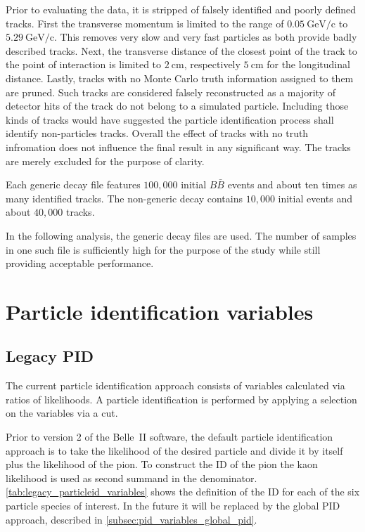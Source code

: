 Prior to evaluating the data, it is stripped of falsely identified and poorly defined tracks. First the transverse momentum is limited to the range of $0.05 \mathrm{~GeV/c}$ to $5.29 \mathrm{~GeV/c}$. This removes very slow and very fast particles as both provide badly described tracks. Next, the transverse distance of the closest point of the track to the point of interaction is limited to $2 \mathrm{~cm}$, respectively $5 \mathrm{~cm}$ for the longitudinal distance. Lastly, tracks with no Monte Carlo truth information assigned to them are pruned. Such tracks are considered falsely reconstructed as a majority of detector hits of the track do not belong to a simulated particle. Including those kinds of tracks would have suggested the particle identification process shall identify non-particles tracks. Overall the effect of tracks with no truth infromation does not influence the final result in any significant way. The tracks are merely excluded for the purpose of clarity.

Each generic decay file features $100,000$ initial $B \bar{B}$ events and about ten times as many identified tracks. The non-generic decay contains $10,000$ initial events and about $40,000$ tracks.

In the following analysis, the generic decay files are used. The number of samples in one such file is sufficiently high for the purpose of the study while still providing acceptable performance.

\section{Particle identification variables}
\label{sec:pid_variables}

\subsection{Legacy PID}
\label{subsec:pid_variables_legacy_pid}

The current particle identification approach consists of variables calculated via ratios of likelihoods. A particle identification is performed by applying a selection on the variables via a cut.

Prior to version 2 of the Belle~\RN{2} software, the default particle identification approach is to take the likelihood of the desired particle and divide it by itself plus the likelihood of the pion. To construct the ID of the pion the kaon likelihood is used as second summand in the denominator. \autoref{tab:legacy_particleid_variables} shows the definition of the ID for each of the six particle species of interest. In the future it will be replaced by the global PID approach, described in \autoref{subsec:pid_variables_global_pid}.

